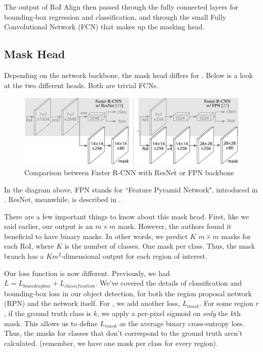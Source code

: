 The output of RoI Align then passed through the fully connected layers for bounding-box regression and classification, and through the small Fully Convolutional Network (FCN) that makes up the masking head.

\subsection{Mask Head}\label{s:maskrcnn-maskhead}
Depending on the network backbone, the mask head differs for \maskrcnn. Below is a look at the two different heads. Both are trivial FCNs.

\begin{figure}[H]
	\centering
	\includegraphics[scale=0.3]{images/backbones.PNG}
	\caption{Comparison between Faster R-CNN with ResNet or FPN backbone}
\end{figure}

In the diagram above, FPN stands for ``Feature Pyramid Network", introduced in . ResNet, meanwhile, is described in .

There are a few important things to know about this mask head. First, like we said earlier, our output is an $m\times m$ mask. However, the authors found it beneficial to have binary masks. In other words, we predict $K$ $m\times m$ masks for each RoI, where $K$ is the number of classes. One mask per class. Thus, the mask branch has a $Km^2$-dimensional output for each region of interest.

Our loss function is now different. Previously, we had $L = L_{boundingbox} + L_{classification}$. We've covered the details of classification and bounding-box loss in our object detection, for both the region proposal network (RPN) and the network itself. For \maskrcnn, we add another loss, $L_{mask}$. For some region $r$, if the ground truth class is $k$, we apply a per-pixel sigmoid on \textit{only} the $k$th mask. This allows us to define $L_{mask}$ as the average binary cross-entropy loss. Thus, the masks for classes that don't correspond to the ground truth aren't calculated. (remember, we have one mask per class for every region).

